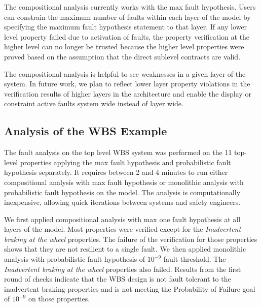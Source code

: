 The compositional analysis currently works with the max fault hypothesis. Users can constrain the maximum number of faults within each layer of the model by specifying the maximum fault hypothesis statement to that layer. If any lower level property failed due to activation of faults, the property verification at the higher level can no longer be trusted because the higher level properties were proved based on the assumption that the direct sublevel contracts are valid.

The compositional analysis is helpful to see weaknesses in a given 
layer of the system. In future work, we plan to reflect lower layer
property violations in the verification results of higher layers in the architecture and enable the display or constraint active faults system wide instead of layer wide.


\subsection{Analysis of the WBS Example}
\label{sec:results}

The fault analysis on the top level WBS system was performed on the 11 top-level properties applying the max fault hypothesis and probabilistic fault hypothesis separately. It requires between 2 and 4 minutes to run either compositional analysis with max fault hypothesis or monolithic analysis with probabilistic fault hypothesis on the model. The analysis is computationally inexpensive, allowing quick iterations between systems and safety engineers.

We first applied compositional analysis with max one fault hypothesis at all layers of the model. Most properties were verified except for the \textit{Inadvertent braking at the wheel} properties. The failure of the verification for those properties shows that they are not resilient to a single fault. We then applied monolithic analysis with probabilistic fault hypothesis of $10^{-9}$ fault threshold. The \textit{Inadvertent braking at the wheel} properties also failed. Results from the first round of checks indicate that the WBS design is not fault tolerant to the inadvertent braking properties and is not meeting the Probability of Failure goal of $10^{-9}$ on those properties.

